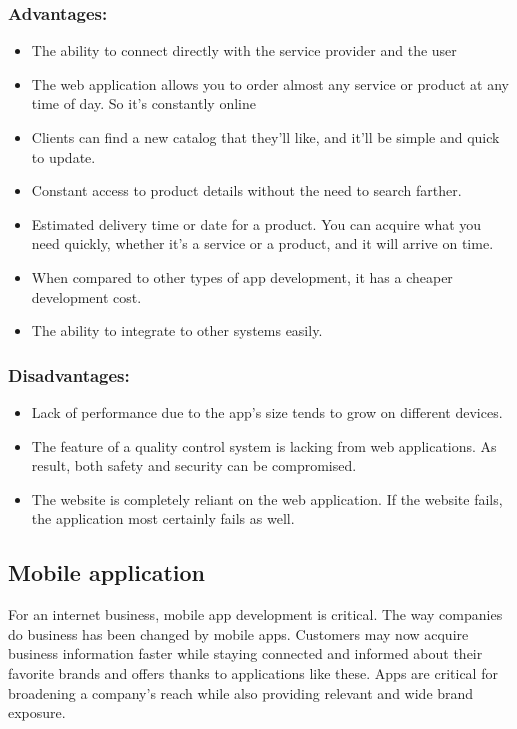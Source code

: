 \documentclass[11pt]{article}
\newcommand\tab[1][1cm]{\hspace*{#1}}
\begin{document}
\subsubsection{Advantages:}

\begin{itemize}
\item The ability to connect directly with the service provider and the user
\item The web application allows you to order almost any service or product at any time of day. So it's constantly online
\item Clients can find a new catalog that they'll like, and it'll be simple and quick to update.
\item Constant access to product details without the need to search farther.
\item Estimated delivery time or date for a product. You can acquire what you need quickly, whether it's a service or a product, and it will arrive on time.
\item When compared to other types of app development, it has a cheaper development cost.
\item The ability to integrate to other systems easily.
\end{itemize}

\subsubsection{Disadvantages:}

\begin{itemize}
\item Lack of performance due to the app's size tends to grow on different devices.
\item The feature of a quality control system is lacking from web applications. As result, both safety and security can be compromised.
\item The website is completely reliant on the web application. If the website fails, the application most certainly fails as well.
\end{itemize}


\subsection{Mobile application}
\tab For an internet business, mobile app development is critical. The way companies do business has been changed by mobile apps. Customers may now acquire business information faster while staying connected and informed about their favorite brands and offers thanks to applications like these. Apps are critical for broadening a company's reach while also providing relevant and wide brand exposure.
\end{document}
